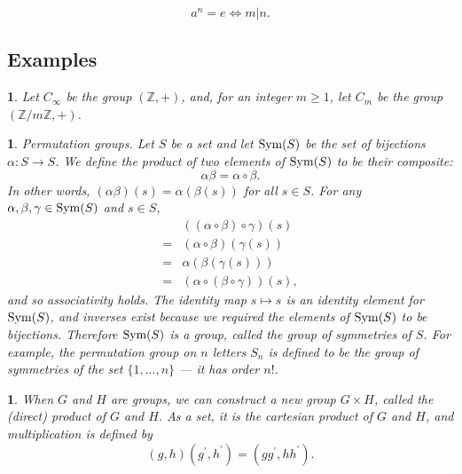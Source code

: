 \documentclass[a4paper,11pt,final,openany]{memoir}%
\newtheorem{plain}[X]{}
\theoremstyle{nonumberplain}
\begin{document}
\[
a^{n}=e\iff m|n.
\]


\subsection{Examples}

\begin{plain}
\label{bd3a}Let $C_{\infty}$ be the group $(\mathbb{Z}{},+)$, and, for an
integer $m\geq1$, let $C_{m}$ be the group $(\mathbb{Z}/m\mathbb{Z}{},+)$.%
%

\end{plain}

\begin{plain}
\label{bd3b}\emph{Permutation groups.\/} Let $S$ be a set and let $\operatorname{Sym}(S)$ be
the set of bijections $\alpha\colon S\rightarrow S$. We define the product of
two elements of $\operatorname{Sym}(S)$ to be their composite:
\[
\alpha\beta=\alpha\circ\beta.
\]
In other words, $(\alpha\beta)(s)=\alpha(\beta(s))$ for all $s\in S$. For any
$\alpha,\beta,\gamma\in\operatorname{Sym}(S)$ and $s\in S$,
\begin{equation}
\begin{aligned}
  &\left(  (\alpha\circ\beta)\circ\gamma\right)  (s)\\
  =&(\alpha\circ\beta
  )(\gamma(s))\\
  =&\alpha(\beta(\gamma(s)))\\
  =&\left(  \alpha\circ(\beta\circ
\gamma)\right)  (s), \end{aligned}
\label{e11}%
\end{equation}
and so associativity holds. The identity map $s\mapsto s$ is an identity
element for $\operatorname{Sym}(S)$, and inverses exist because we required the elements of
$\operatorname{Sym}(S)$ to be bijections. Therefore $\operatorname{Sym}(S)$ is a group, called the
\emph{group of symmetries}%
of $S$. For example, the \emph{permutation group on} $n$ \emph{letters}%
%
%
\/ $S_{n}$ is defined to be the group of symmetries of the set $\{1,...,n\}$
--- it has order $n!$.
\end{plain}

\begin{plain}
\label{bd3c}When $G$ and $H$ are groups, we can construct a new group $G\times
H$, called the \emph{(direct) product\/}%
of $G$ and $H$. As a set, it is the cartesian product of $G$ and $H$, and
multiplication is defined by
\[
(g,h)(g^{\prime},h^{\prime})=(gg^{\prime},hh^{\prime}).
\]

\end{plain}
\end{document}
